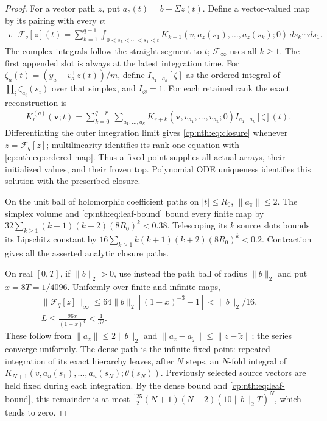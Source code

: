 \begin{proof}
For a vector path \(z\), put \(a_z(t)=b-\Sigma z(t)\). Define a vector-valued
map by its pairing with every \(v\):
\begin{equation}\label{cp:nth:eq:ordered-map}{\begin{gathered}
v^\top\mathcal F_q[z](t)=
\sum_{k=1}^{q-1}\int_{0<s_k<\cdots<s_1<t}
K_{k+1}(v,a_z(s_1),\ldots,a_z(s_k);0)\,ds_k\cdots ds_1.
\end{gathered}}\end{equation} The complex integrals follow the straight
segment to \(t\); \(\mathcal F_\infty\) uses all \(k\ge1\). The first
appended slot is always at the latest integration time. For
\(\zeta_a(t)=(y_a-v_a^\top z(t))/m\), define \(I_{a_1\ldots a_k}[\zeta]\) as the
ordered integral of \(\prod_i \zeta_{a_i}(s_i)\) over that simplex, and
\(I_\varnothing=1\). For each retained rank the exact reconstruction is
\begin{equation}\label{cp:nth:eq:reconstruction}{\begin{gathered}
K_r^{(q)}(\mathbf v;t)=
\sum_{k=0}^{q-r}\ \sum_{a_1,\ldots,a_k}
K_{r+k}(\mathbf v,v_{a_1},\ldots,v_{a_k};0)
I_{a_1\ldots a_k}[\zeta](t).
\end{gathered}}\end{equation} Differentiating the outer integration
limit gives \eqref{cp:nth:eq:closure} whenever
\(z=\mathcal F_q[z]\); multilinearity identifies its rank-one equation
with \eqref{cp:nth:eq:ordered-map}. Thus a fixed point
supplies all actual arrays, their initialized values, and their frozen
top. Polynomial ODE uniqueness identifies this solution with the
prescribed closure.

On the unit ball of holomorphic coefficient paths on \(|t|\le R_0\),
\(\|a_z\|\le2\). The simplex volume and
\eqref{cp:nth:eq:leaf-bound} bound every finite map by
\(32\sum_{k\ge1}(k+1)(k+2)(8R_0)^k<0.38\).
Telescoping its \(k\) source slots bounds its Lipschitz constant by
\(16\sum_{k\ge1}k(k+1)(k+2)(8R_0)^k<0.2\).
Contraction gives all the asserted analytic closure paths.

On real \([0,T]\), if \(\|b\|_2>0\), use instead the path ball of radius
\(\|b\|_2\) and put \(x=8T=1/4096\). Uniformly over finite and infinite
maps,
\begin{equation}\label{cp:nth:eq:contraction}{\begin{gathered}
\|\mathcal F_q[z]\|_\infty
\le64\|b\|_2[(1-x)^{-3}-1]<\|b\|_2/16,\qquad\\
L\le\frac{96x}{(1-x)^4}<\frac1{32}.
\end{gathered}}\end{equation} These follow from \(\|a_z\|\le2\|b\|_2\)
and \(\|a_z-a_{\widetilde z}\|\le\|z-\widetilde z\|\); the series
converge uniformly. The dense path is the infinite fixed point: repeated
integration of its exact hierarchy leaves, after \(N\) steps, an
\(N\)-fold integral of
\(K_{N+1}(v,a_u(s_1),\ldots,a_u(s_N);\theta(s_N))\). Previously selected
source vectors are held fixed during each integration. By the dense
bound and \eqref{cp:nth:eq:leaf-bound}, this remainder is at
most
\(\frac{125}{2}(N+1)(N+2)(10\|b\|_2T)^N\),
which tends to zero.


\end{proof}

